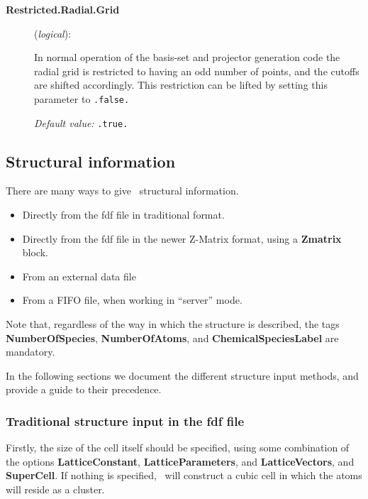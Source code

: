 \begin{description}
\item[\textbf{Restricted.Radial.Grid}] (\textit{logical}):

In normal operation of the basis-set and projector generation code the
radial grid is restricted to having an odd number of points, and the
cutoffs are shifted accordingly. This restriction can be lifted by
setting this parameter to \texttt{.false.}

\textit{Default value:} \texttt{.true.}
\end{description}


\vspace{5pt}
\subsection{Structural information}

There are many ways to give \siesta\ structural information.

\begin{itemize}
\item Directly from the fdf file in traditional format.
\item Directly from the fdf file in the newer Z-Matrix format, using
a \textbf{Zmatrix} block.
\item From an external data file
\item From a FIFO file, when working in ``server'' mode.
\end{itemize}

Note that, regardless of the way in which the structure is described,
the tags
\textbf{NumberOfSpecies}, 
\textbf{NumberOfAtoms}, 
and \textbf{ChemicalSpeciesLabel}
 are mandatory.

In the following sections we document the different structure input
methods, and provide a guide to their precedence.

\subsubsection{Traditional structure input in the fdf file}

Firstly, the size of the cell itself should be specified, using
some combination of the options
\textbf{LatticeConstant}, \textbf{LatticeParameters},
and \textbf{LatticeVectors}, and \textbf{SuperCell}.
If nothing is specified, \siesta\ will construct a cubic
cell in which the atoms will reside as a cluster.


